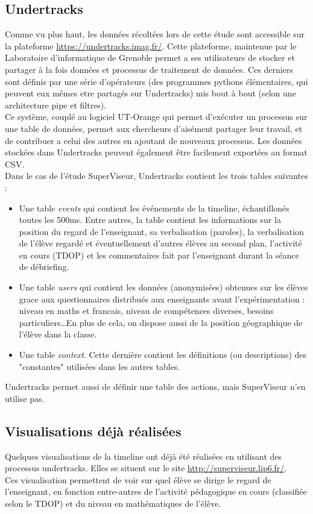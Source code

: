 \documentclass{article}
\begin{document}
\subsection{Undertracks}
Comme vu plus haut, les données récoltées lors de cette étude sont accessible sur la plateforme \href{https://undertracks.imag.fr/}{https://undertracks.imag.fr/}.
Cette plateforme, maintenue par le Laboratoire d'informatique de Grenoble permet a ses utilisateurs de stocker et partager à la fois données et processus de traitement de données. Ces derniers sont définis par une série d'opérateurs (des programmes pythons élémentaires, qui peuvent eux mêmes etre partagés sur Undertracks) mis bout à bout (selon une architecture pipe et filtres).\\
Ce système, couplé au logiciel UT-Orange qui permet d'exécuter un processus sur une table de données, permet aux chercheurs d'aisément partager leur travail, et de contribuer a celui des autres en ajoutant de nouveaux processus. Les données stockées dans Undertracks peuvent également être facilement exportées au format CSV.\\
Dans le cas de l'étude SuperViseur, Undertracks contient les trois tables suivantes :
\begin{itemize}
  \item Une table \textit{events} qui contient les événements de la timeline, échantillonés toutes les 500ms. Entre autres, la table contient les informations sur la position du regard de l'enseignant, sa verbalisation (paroles), la verbalisation de l'élève regardé et éventuellement d'autres élèves au second plan, l'activité en cours (TDOP) et les commentaires fait par l'enseignant durant la séance de débriefing.
  \item Une table \textit{users} qui contient les données (anonymisées) obtenues sur les élèves grace aux questionnaires distribués aux enseignants avant l'expérimentation : niveau en maths et francais, niveau de compétences diverses, besoins particuliers\ldots En plus de cela, on dispose aussi de la position géographique de l'élève dans la classe.
  \item Une table \textit{context}. Cette dernière contient les définitions (ou descriptions) des "constantes" utilisées dans les autres tables.
\end{itemize}
Undertracks permet aussi de définir une table des actions, mais SuperViseur n'en utilise pas.

\subsection{Visualisations déjà réalisées}
Quelques visualisations de la timeline ont déjà été réalisées en utilisant des processus undertracks. Elles se situent sur le site \href{http://superviseur.lip6.fr/}{http://superviseur.lip6.fr/}.\\
Ces visualisation permettent de voir sur quel élève se dirige le regard de l'enseignant, en fonction entre-autres de l'activité pédagogique en cours (classifiée selon le TDOP) et du niveau en mathématiques de l'élève.\\
\end{document}
